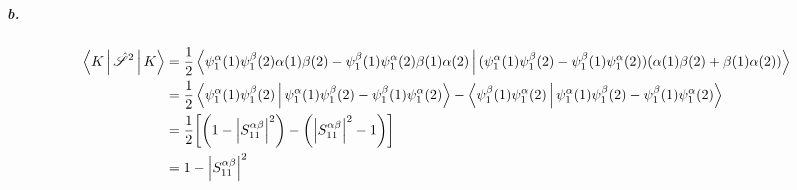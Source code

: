\documentclass[a4paper]{article}
\newcommand{\hsS}{\hat{\mathscr{S}}}
\newcommand{\subex}[1]{\subparagraph{#1}}
\numberwithin{equation}{subsection}
\begin{document}
\subex{b.}
\begin{align}
\Braket{K | \hsS^2 | K} &= \dfrac{1}{2} \Braket{\psi_1^\alpha(1)\psi_1^\beta(2)\alpha(1)\beta(2) - \psi_1^\beta(1)\psi_1^\alpha(2)\beta(1)\alpha(2) | (\psi_1^\alpha(1)\psi_1^\beta(2) - \psi_1^\beta(1)\psi_1^\alpha(2)) (\alpha(1)\beta(2) + \beta(1)\alpha(2))} \notag\\
&= \dfrac{1}{2} \Braket{\psi_1^\alpha(1)\psi_1^\beta(2) | \psi_1^\alpha(1)\psi_1^\beta(2) - \psi_1^\beta(1)\psi_1^\alpha(2)} - \Braket{\psi_1^\beta(1)\psi_1^\alpha(2) | \psi_1^\alpha(1)\psi_1^\beta(2) - \psi_1^\beta(1)\psi_1^\alpha(2)} \notag\\
&= \dfrac{1}{2}\qty[\qty(1 - \abs{S_{11}^{\alpha\beta}}^2) - \qty(\abs{S_{11}^{\alpha\beta}}^2 - 1)] \notag\\
&= 1 - \abs{S_{11}^{\alpha\beta}}^2
\end{align}
\end{document}
